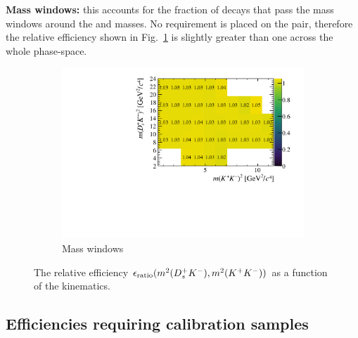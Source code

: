 \begin{description}
\item \textbf{Mass windows:} this accounts for the fraction of decays that pass the mass windows around the \Dsp and \Dzb masses. No requirement is placed on the \Kp\Km pair, therefore the relative efficiency shown in Fig.~\ref{fig:B2DsKK_releff_masswindows} is slightly greater than one across the whole phase-space. 
\end{description}



\begin{figure}[!h]
   \centering
   \begin{subfigure}[t]{0.45\textwidth}
      \includegraphics[width=1.0\textwidth]{figs/B2DsKK/Relative_Eff_mass_All.pdf}
      \caption{Mass windows}
      \label{fig:B2DsKK_releff_masswindows}
   \end{subfigure}
   \caption{The relative efficiency $\epsilon_{\text{ratio}}(m^{2}({{D}^+_{s}}{{K}^-}),m^{2}({{K}^+}{{K}^-}))$ as a function of the \decay{\Bp}{\Dsp\Kp\Km} kinematics.}
   \label{fig:B2DsKK_dalitz_eff_two}
\end{figure}


\subsection{Efficiencies requiring calibration samples} 
\label{sec:B2DsKK_eff_from_calib}

